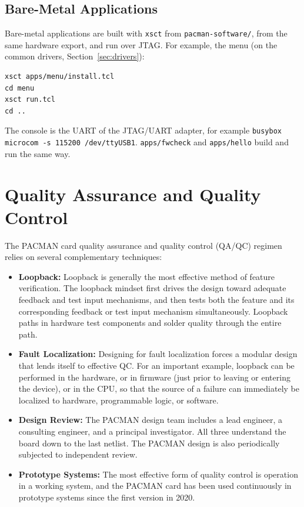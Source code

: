 \documentclass[12pt]{article}
\begin{document}
\subsection{Bare-Metal Applications}

Bare-metal applications are built with \texttt{xsct} from \texttt{pacman-software/}, from the same
hardware export, and run over JTAG.  For example, the menu (on the common drivers,
Section~\ref{sec:drivers}):
\begin{lstlisting}[frame=leftline]
xsct apps/menu/install.tcl
cd menu
xsct run.tcl
cd ..
\end{lstlisting}
The console is the UART of the JTAG/UART adapter, for example
\texttt{busybox microcom -s 115200 /dev/ttyUSB1}.  \texttt{apps/fwcheck} and \texttt{apps/hello}
build and run the same way.


\newpage
\section{Quality Assurance and Quality Control}

The PACMAN card quality assurance and quality control (QA/QC) regimen
relies on several complementary techniques:
\begin{itemize}

\item {\bf Loopback:} Loopback is generally the most effective method
  of feature verification.  The loopback mindset first drives the
  design toward adequate feedback and test input mechanisms, and then
  tests both the feature and its corresponding feedback or test input
  mechanism simultaneously.  Loopback paths in hardware test
  components and solder quality through the entire path.

\item {\bf Fault Localization:} Designing for fault localization
  forces a modular design that lends itself to effective QC.  For an
  important example, loopback can be performed in the hardware, or in
  firmware (just prior to leaving or entering the device), or in the
  CPU, so that the source of a failure can immediately be localized to
  hardware, programmable logic, or software.

\item {\bf Design Review:} The PACMAN design team includes a lead
  engineer, a consulting engineer, and a principal investigator.
  All three understand the board down to the last netlist.  The
  PACMAN design is also periodically subjected to independent review.

\item {\bf Prototype Systems:} The most effective form of quality
  control is operation in a working system, and the PACMAN card has
  been used continuously in prototype systems since the first version
  in 2020.

\end{itemize}
\end{document}
